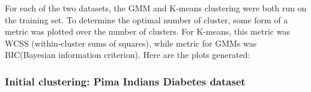 \documentclass[11pt]{article}
\begin{document}




            For each of the two datasets,
            the GMM and K-means clustering were both run on the training set. To determine the optimal number
            of cluster, some form of a metric was plotted over the number of clusters. For K-means, this metric
            was WCSS (within-cluster sums of squares), while metric for GMMs was BIC(Bayesian information criterion).
            Here are the plots generated:

            \subsubsection{Initial clustering: Pima Indians Diabetes dataset}
\end{document}
